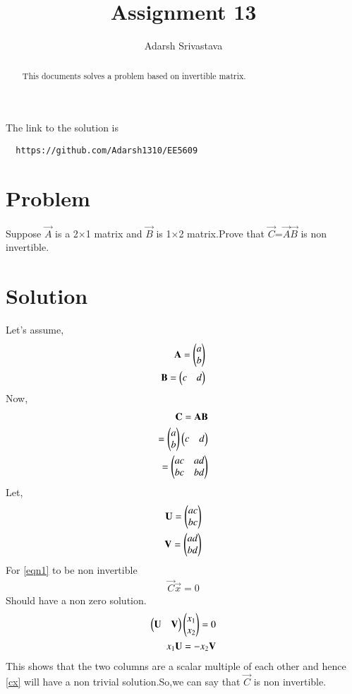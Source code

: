\documentclass[journal,12pt,twocolumn]{IEEEtran}
\begin{document}
      \def\rightbox#1{\makebox[0in][r]{#1}}
      \def\centbox#1{\makebox[0in]{#1}}
      \def\topbox#1{\raisebox{-\baselineskip}[0in][0in]{#1}}
      \def\midbox#1{\raisebox{-0.5\baselineskip}[0in][0in]{#1}}
 \vspace{3cm}
 \title{Assignment 13}
 \author{Adarsh Srivastava}
 \maketitle
 \newpage
 \bigskip
 \renewcommand{\thetable}{\theenumi}
 The link to the solution is
 \begin{lstlisting}
  https://github.com/Adarsh1310/EE5609
 \end{lstlisting}
 \begin{abstract}
 This documents solves a problem based on invertible matrix.
 \end{abstract}
  \section{\textbf{Problem}}
Suppose $\vec{A}$ is a 2$\times$1  matrix and $\vec{B}$ is 1$\times$2 matrix.Prove that $\vec{C}$=$\vec{A}$$\vec{B}$ is non invertible.
 \section{\textbf{Solution}}
 Let's assume,
 \begin{align}
 \mathbf{A}=\begin{pmatrix}a\\b\end{pmatrix}\\
 \mathbf{B}=\begin{pmatrix}c&d\end{pmatrix}
 \end{align}
 Now,
 \begin{align}
 \mathbf{C}=\mathbf{A}\mathbf{B}\\
 =\begin{pmatrix}a\\b\end{pmatrix}\begin{pmatrix}c&d\end{pmatrix}\\
 =\begin{pmatrix}ac&ad\\bc&bd\end{pmatrix}\label{eqn1}
 \end{align}
 Let,
 \begin{align}
 \mathbf{U}=\begin{pmatrix}ac\\bc\end{pmatrix}\\
 \mathbf{V}=\begin{pmatrix}ad\\bd\end{pmatrix}
 \end{align}
 For \eqref{eqn1} to be non invertible
 \begin{align}
 \vec{C}\vec{x}=0\label{cx}
 \end{align}
 Should have a non zero solution.
 \begin{align}
 \begin{pmatrix}\mathbf{U}&\mathbf{V}\end{pmatrix}\begin{pmatrix}x_1\\x_2\end{pmatrix}=0\\
 x_1\mathbf{U}=-x_2\mathbf{V}
 \end{align}
 This shows that the two columns are a scalar multiple of each other and hence \eqref{cx} will have a non trivial solution.So,we can say that $\vec{C}$ is non invertible.
\end{document}
